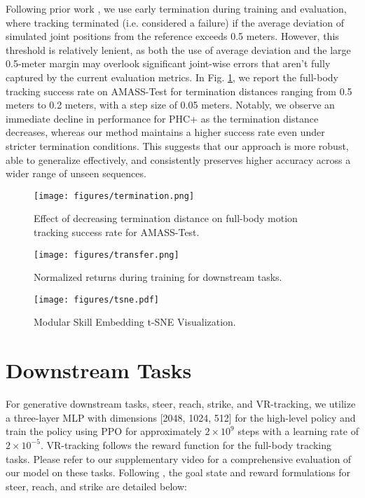\noindent Following prior work \cite{Luo2023PerpetualHC}, we use early termination during training and evaluation, where tracking terminated (i.e. considered a failure) if the average deviation of simulated joint positions from the reference exceeds 0.5 meters. However, this threshold is relatively lenient, as both the use of average deviation and the large 0.5-meter margin may overlook significant joint-wise errors that aren't fully captured by the current evaluation metrics. In Fig. \ref{fig:terminate}, we report the full-body tracking success rate on AMASS-Test for termination distances ranging from 0.5 meters to 0.2 meters, with a step size of 0.05 meters. Notably, we observe an immediate decline in performance for PHC+ as the termination distance decreases, whereas our method maintains a higher success rate even under stricter termination conditions. This suggests that our approach is more robust, able to generalize effectively, and consistently preserves higher accuracy across a wider range of unseen sequences.\\

\begin{figure}[h]
    \centering
    \texttt{[image: figures/termination.png]}
    \vspace{-0.5cm}
    \caption{Effect of decreasing termination distance on full-body motion tracking success rate for AMASS-Test.}
    \label{fig:terminate}
\end{figure}
\begin{figure*}
    \centering
    \texttt{[image: figures/transfer.png]}
    \caption{Normalized returns during training for downstream tasks.}
    \label{fig:transfer}
\end{figure*}
\begin{figure*}[h]
    \centering
    \texttt{[image: figures/tsne.pdf]}
    \caption{Modular Skill Embedding t-SNE Visualization.}
    \label{fig:tsne}
\end{figure*}
\section{Downstream Tasks}
\label{sec:gen}
\noindent For generative downstream tasks, steer, reach, strike, and VR-tracking, we utilize a three-layer MLP with dimensions [2048, 1024, 512] for the high-level policy and train the policy using PPO \cite{schulman2017proximalpolicyoptimizationalgorithms} for approximately $2 \times 10^9$ steps with a learning rate of $2 \times 10^{-5}$. VR-tracking follows the reward function for the full-body tracking tasks. Please refer to our supplementary video for a comprehensive evaluation of our model on these tasks. Following \cite{2022-TOG-ASE, luo2024universal}, the goal state and reward formulations for steer, reach, and strike are detailed below:\\ 

